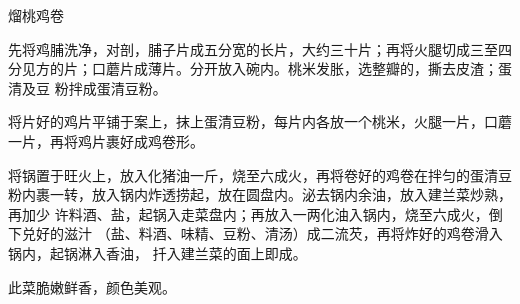 \begin{recipe}{熘桃鸡卷}

\ingredients


\preparation

\step 先将鸡脯洗净，对剖，脯子片成五分宽的长片，大约三十片；再将火腿切成三至四
分见方的片；口蘑片成薄片。分开放入碗内。桃米发胀，选整瓣的，撕去皮渣；蛋清及豆
粉拌成蛋清豆粉。

\step 将片好的鸡片平铺于案上，抹上蛋清豆粉，每片内各放一个桃米，火腿一片，口蘑
一片，再将鸡片裹好成鸡卷形。

\step 将锅置于旺火上，放入化猪油一斤，烧至六成火，再将卷好的鸡卷在拌匀的蛋清豆
粉内裹一转，放入锅内炸透捞起，放在圆盘内。泌去锅内余油，放入建兰菜炒熟，再加少
许料酒、盐，起锅入走菜盘内；再放入一两化油入锅内，烧至六成火，倒下兑好的滋汁
（盐、料酒、味精、豆粉、清汤）成二流芡，再将炸好的鸡卷滑入锅内，起锅淋入香油，
扦入建兰菜的面上即成。

\features

此菜脆嫩鲜香，颜色美观。

\end{recipe}

